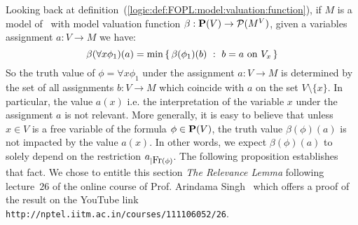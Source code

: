 Looking back at
definition~(\ref{logic:def:FOPL:model:valuation:function}), if $M$
is a model of \pv\ with model valuation function $\beta:\mbox{${\bf P}(V)$}\to{\cal
P}(M^{V})$, given a variables assignment $a:V\to M$ we have:
    \[
    \beta(\forall x\phi_{1})(a)=\min\left\{\,\beta(\phi_{1})(b)\ :\  b=a\mbox{\ on\
                    }V_{x}\,\right\}
    \]
So the truth value of $\phi=\forall x\phi_{1}$ under the assignment
$a:V\to M$ is determined by the set of all assignments $b:V\to M$
which coincide with $a$ on the set $V\setminus\{x\}$. In particular,
the value $a(x)$ i.e. the interpretation of the variable $x$ under
the assignment $a$ is not relevant. More generally, it is easy to
believe that unless $x\in V$ is a free variable of the formula
$\phi\in\mbox{${\bf P}(V)$}$, the truth value $\beta(\phi)(a)$ is not impacted by
the value $a(x)$. In other words, we expect $\beta(\phi)(a)$ to
solely depend on the restriction $a_{|\mbox{\rm Fr}(\phi)}$. The following
proposition establishes that fact. We chose to entitle this section
{\em The Relevance Lemma} following lecture~$26$ of the online
course of Prof. Arindama Singh~\cite{Singh} which offers a proof of
the result on the YouTube link
\texttt{http://nptel.iitm.ac.in/courses/111106052/26}.

